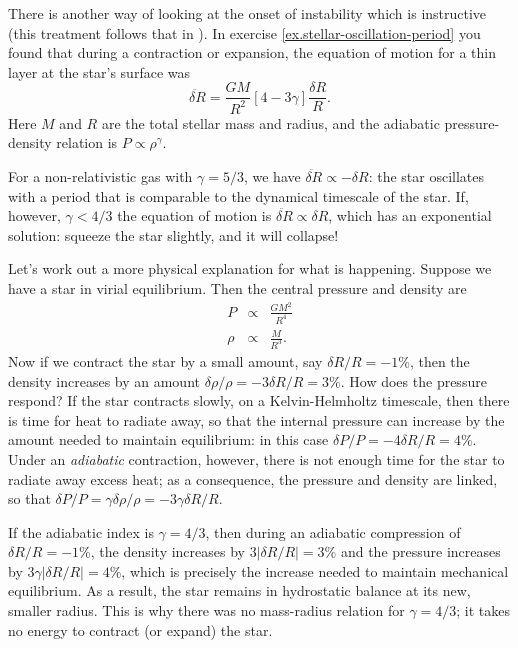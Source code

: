 \begin{sidebar}
There is another way of looking at the onset of instability which is instructive (this treatment follows that in \citet{Cox1980Theory-of-Stell}). In exercise \ref{ex.stellar-oscillation-period} you found that during a contraction or expansion, the equation of motion for a thin layer at the star's surface was
\[
	\ddot{\delta R} = \frac{GM}{R^{2}}\left[4-3\gamma\right]\frac{\delta R}{R}.
\]
Here $M$ and $R$ are the total stellar mass and radius, and the adiabatic pressure-density relation is $P\propto \rho^{\gamma}$.

For a non-relativistic gas with $\gamma = 5/3$, we have $\ddot{\delta R} \propto -\delta R$: the star oscillates with a period that is comparable to the dynamical timescale of the star. If, however, $\gamma < 4/3$ the equation of motion is $\ddot{\delta R} \propto \delta R$, which has an exponential solution: squeeze the star slightly, and it will collapse!

Let's work out a more physical explanation for what is happening. Suppose we have a star in virial equilibrium. Then the central pressure and density are
\begin{eqnarray*}
P &\propto& \frac{GM^{2}}{R^{4}} \\
\rho &\propto& \frac{M}{R^{3}}.
\end{eqnarray*}
Now if we contract the star by a small amount, say $\delta R/R = -1\%$, then the density increases by an amount $\delta\rho/\rho = -3\delta R/R = 3\%$. How does the pressure respond? If the star contracts slowly, on a Kelvin-Helmholtz timescale, then there is time for heat to radiate away, so that the internal pressure can increase by the amount needed to maintain equilibrium: in this case $\delta P/P = -4\delta R/R = 4\%$. Under an \emph{adiabatic} contraction, however, there is not enough time for the star to radiate away excess heat; as a consequence, the pressure and density are linked, so that $\delta P/P = \gamma\delta \rho/\rho = -3\gamma\delta R/R$.

If the adiabatic index is $\gamma = 4/3$, then during an adiabatic compression of $\delta R/R = -1\%$, the density increases by $3|\delta R/R| = 3\%$ and the pressure increases by $3\gamma|\delta R/R| = 4\%$, which is precisely the increase needed to maintain mechanical equilibrium. As a result, the star remains in hydrostatic balance at its new, smaller radius. This is why there was no mass-radius relation for $\gamma = 4/3$; it takes no energy to contract (or expand) the star.


\end{sidebar}
